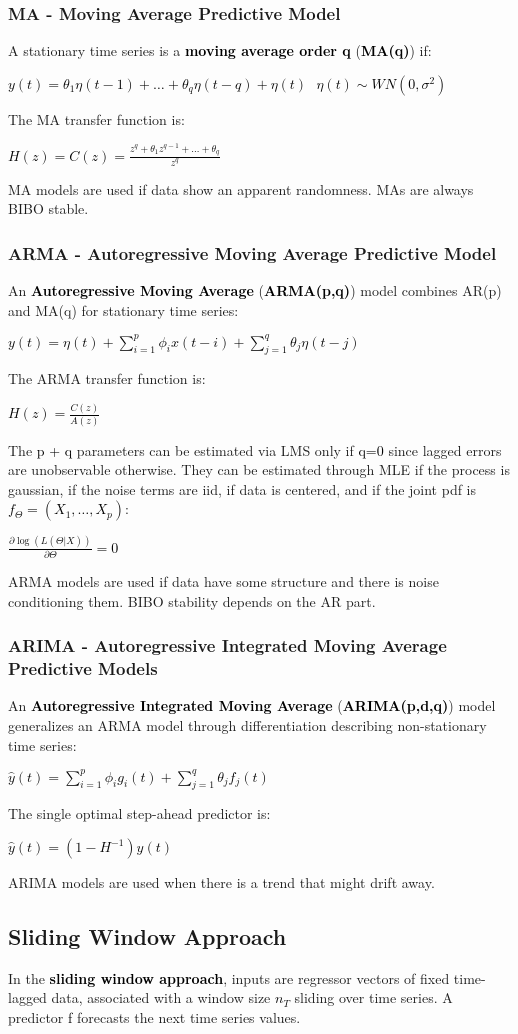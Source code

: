 \documentclass{article}
\newcommand{\bb}[1]{\textcolor{black}{\textbf{#1}}}
\newcommand{\rr}[1]{\textcolor{black}{#1}}
\newcommand{\cc}[1]{\begin{center}\textcolor{black}{#1}\end{center}}
\begin{document}
\subsubsection{MA - Moving Average Predictive Model}
A stationary time series is a \bb{moving average order q} (\bb{MA(q)}) if:
\cc{$y(t) = \theta_1\eta(t-1) + \dots + \theta_q\eta(t-q) + \eta(t) \ \ \ \eta(t) \sim WN(0,\sigma^2)$}
The MA transfer function is:
\cc{$H(z) = C(z) = \displaystyle\frac{z^q + \theta_1z^{q-1}+ \dots + \theta_q}{z^q}$}
MA models are used if data show an apparent randomness. MAs are always BIBO stable.
\subsubsection{ARMA - Autoregressive Moving Average Predictive Model}
An \bb{Autoregressive Moving Average} (\bb{ARMA(p,q)}) model combines AR(p) and MA(q) for stationary time series:
\cc{$y(t) =\eta(t) + \displaystyle\sum^p_{i=1} \phi_ix(t-i) + \displaystyle\sum^q_{j=1}\theta_j\eta(t-j)$}
The ARMA transfer function is:
\cc{$H(z)=\displaystyle\frac{C(z)}{A(z)}$}
The \rr{p + q} parameters can be estimated via LMS only if \rr{q=0} since lagged errors are unobservable otherwise. They can be estimated through MLE if the process is gaussian, if the noise terms are iid, if data is centered, and if the joint pdf is \rr{$f_\Theta = (X_1, \dots, X_p)$}:
\cc{$\displaystyle\frac{\partial\log(L(\Theta|X))}{\partial\Theta} = 0$}
ARMA models are used if data have some structure and there is noise conditioning them. BIBO stability depends on the AR part. 
\subsubsection{ARIMA - Autoregressive Integrated Moving Average Predictive Models}
An \bb{Autoregressive Integrated Moving Average} (\bb{ARIMA(p,d,q)}) model generalizes an ARMA model through differentiation describing non-stationary time series:
\cc{$\hat{y}(t) = \displaystyle\sum^p_{i=1} \phi_ig_i(t) + \displaystyle\sum^q_{j=1}\theta_jf_j(t)$}
The single optimal step-ahead predictor is:
\cc{$\hat{y}(t) = (1 - H^{-1})y(t)$}
ARIMA models are used when there is a trend that might drift away.

\subsection{Sliding Window Approach}
In the \bb{sliding window approach}, inputs are regressor vectors of fixed time-lagged data, associated with a window size \rr{$n_T$} sliding over time series. A predictor \rr{f} forecasts the next time series values.
\end{document}
